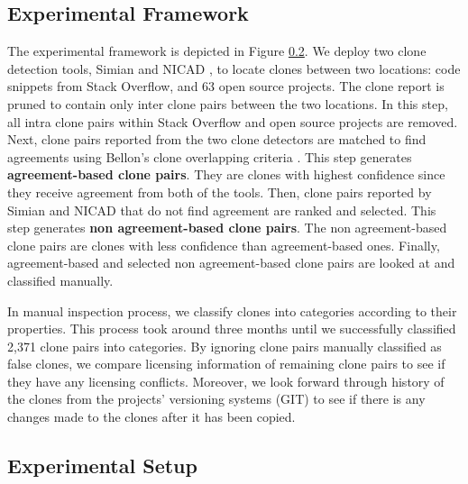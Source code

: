 \documentclass{sig-alternate-05-2015}
\begin{document}
\subsection{Experimental Framework}
The experimental framework is depicted in Figure \ref{}. We deploy two clone detection tools, Simian \cite{simian} and NICAD \cite{Roy2008,Cordy}, to locate clones between two locations: code snippets from Stack Overflow, and 63 open source projects. The clone report is pruned to contain only inter clone pairs between the two locations. In this step, all intra clone pairs within Stack Overflow and open source projects are removed. Next, clone pairs reported from the two clone detectors are matched to find agreements using Bellon's clone overlapping criteria \cite{Bellon2007}. This step generates \textbf{agreement-based clone pairs}. They are clones with highest confidence since they receive agreement from both of the tools. Then, clone pairs reported by Simian and NICAD that do not find agreement are ranked and selected. This step generates \textbf{non agreement-based clone pairs}. The non agreement-based clone pairs are clones with less confidence than agreement-based ones. Finally, agreement-based and selected non agreement-based clone pairs are looked at and classified manually.

In manual inspection process, we classify clones into categories according to their properties. This process took around three months until we successfully classified 2,371 clone pairs into categories. By ignoring clone pairs manually classified as false clones, we compare licensing information of remaining clone pairs to see if they have any licensing conflicts. Moreover, we look forward through history of the clones from the projects' versioning systems (GIT) to see if there is any changes made to the clones after it has been copied.

\subsection{Experimental Setup}
\end{document}
